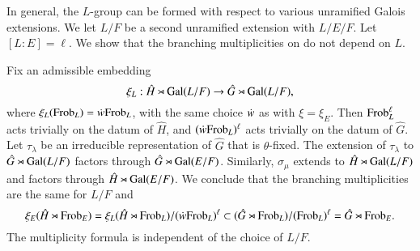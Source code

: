 In general, the $L$-group can be formed with respect to various
unramified Galois extensions.
We let $L/F$ be a second unramified extension with $L/E/F$.  Let
$[L:E]=\ell$.  We show that the  branching multiplicities on
do not depend on $L$.

Fix an admissible embedding
\[
\xi_L:\hat H \rtimes {\operatorname{Gal}}(L/F)\to \hat G \rtimes {\operatorname{Gal}}(L/F),
\]
where $\xi_L({\operatorname{Frob}}_L) = \dot w {\operatorname{Frob}}_L$, with the same choice $\dot w $
as with $\xi = \xi_E$.  Then ${\operatorname{Frob}}_L^\ell$ acts trivially on the
datum of $\hat H$, and $(\dot w {\operatorname{Frob}}_L)^\ell$ acts trivially on the
datum of $\hat G$.  Let $\tau_\lambda$ be an irreducible
representation of $\hat G$ that is $\theta$-fixed.  The extension of
$\tau_\lambda$ to $\hat G\rtimes {\operatorname{Gal}}(L/F)$ factors through $\hat
G\rtimes {\operatorname{Gal}}(E/F)$.  Similarly, $\sigma_\mu$ extends to $\hat
H\rtimes {\operatorname{Gal}}(L/F)$ and factors through $\hat
H\rtimes{\operatorname{Gal}}(E/F)$.  We conclude that the branching multiplicities
are the same for $L/F$ and
\[
\xi_E(\hat H \rtimes {\operatorname{Frob}}_E) 
= \xi_L(\hat H\rtimes {\operatorname{Frob}}_L)/(\dot w {\operatorname{Frob}}_L)^\ell 
\subset (\hat G\rtimes {\operatorname{Frob}}_L)/( {\operatorname{Frob}}_L)^\ell 
= \hat G\rtimes {\operatorname{Frob}}_E.
\]
The multiplicity formula is independent of the choice of $L/F$.

